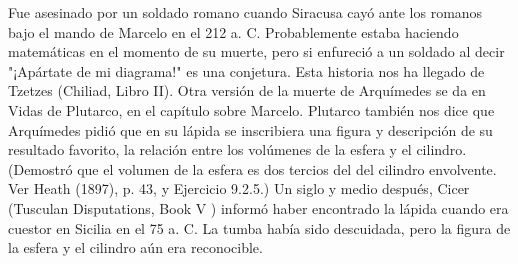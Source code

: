 \documentclass{book}
\begin{document}
    Fue asesinado por un soldado romano cuando Siracusa cayó ante los romanos bajo el mando de Marcelo 
    en el 212 a. C. Probablemente estaba haciendo matemáticas en el momento de su muerte, 
    pero si enfureció a un soldado al decir "¡Apártate de mi diagrama!" es una conjetura. 
    Esta historia nos ha llegado de Tzetzes (Chiliad, Libro II). Otra versión de la muerte de 
    Arquímedes se da en Vidas de Plutarco, en el capítulo sobre Marcelo. Plutarco también nos 
    dice que Arquímedes pidió que en su lápida se inscribiera una figura y descripción de su 
    resultado favorito, la relación entre los volúmenes de la esfera y el cilindro. (Demostró que 
    el volumen de la esfera es dos tercios del del cilindro envolvente. Ver Heath (1897), p. 43, y 
    Ejercicio 9.2.5.) Un siglo y medio después, Cicer (Tusculan Disputations, Book V ) informó haber 
    encontrado la lápida cuando era cuestor en Sicilia en el 75 a. C. La tumba había sido descuidada, 
    pero la figura de la esfera y el cilindro aún era reconocible.
\end{document}
